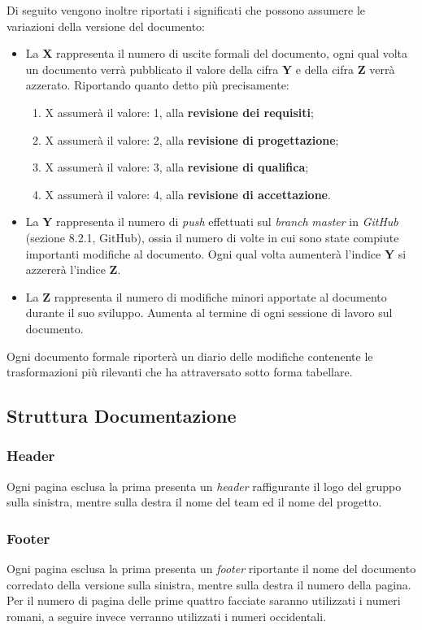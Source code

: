 Di seguito vengono inoltre riportati i significati che possono assumere le variazioni della versione del documento:
\begin{itemize}
\item La \textbf{X} rappresenta il numero di uscite formali del documento, ogni qual volta un documento verrà pubblicato il valore della cifra \textbf{Y} e della cifra \textbf{Z} verrà azzerato. Riportando quanto detto più precisamente:
\begin{enumerate}
\item X assumerà il valore: 1, alla \textbf{revisione dei requisiti};
\item X assumerà il valore: 2, alla \textbf{revisione di progettazione};
\item X assumerà il valore: 3, alla \textbf{revisione di qualifica};
\item X assumerà il valore: 4, alla \textbf{revisione di accettazione}.
\end{enumerate}
\item La \textbf{Y} rappresenta il numero di \textit{push} effettuati sul \textit{branch} \textit{master} in \textit{GitHub} (sezione 8.2.1, GitHub), ossia il numero di volte in cui sono state compiute importanti modifiche al documento. Ogni qual volta aumenterà l'indice \textbf{Y} si azzererà l'indice \textbf{Z}.
\item La \textbf{Z} rappresenta il numero di modifiche minori apportate al documento durante il suo sviluppo.
Aumenta al termine di ogni sessione di lavoro sul documento.
\end{itemize}

Ogni documento formale riporterà un diario delle modifiche contenente le trasformazioni più rilevanti che ha attraversato sotto forma tabellare.

\subsection{Struttura Documentazione}
\subsubsection{Header}
Ogni pagina esclusa la prima presenta un \textit{header} raffigurante il logo del gruppo sulla sinistra, mentre sulla destra il nome del team ed il nome del progetto.
\subsubsection{Footer}
Ogni pagina esclusa la prima presenta un \textit{footer} riportante il nome del documento corredato della versione sulla sinistra, mentre sulla destra il numero della pagina.
Per il numero di pagina delle prime quattro facciate saranno utilizzati i numeri romani, a seguire invece verranno utilizzati i numeri occidentali.
